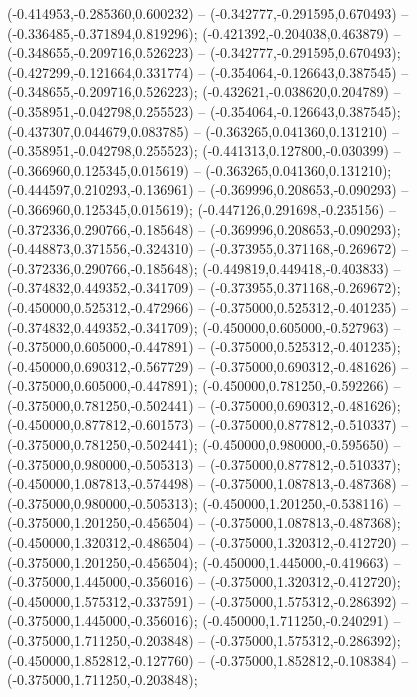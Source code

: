 (-0.414953,-0.285360,0.600232) -- (-0.342777,-0.291595,0.670493) -- (-0.336485,-0.371894,0.819296);
 (-0.421392,-0.204038,0.463879) -- (-0.348655,-0.209716,0.526223) -- (-0.342777,-0.291595,0.670493);
 (-0.427299,-0.121664,0.331774) -- (-0.354064,-0.126643,0.387545) -- (-0.348655,-0.209716,0.526223);
 (-0.432621,-0.038620,0.204789) -- (-0.358951,-0.042798,0.255523) -- (-0.354064,-0.126643,0.387545);
 (-0.437307,0.044679,0.083785) -- (-0.363265,0.041360,0.131210) -- (-0.358951,-0.042798,0.255523);
 (-0.441313,0.127800,-0.030399) -- (-0.366960,0.125345,0.015619) -- (-0.363265,0.041360,0.131210);
 (-0.444597,0.210293,-0.136961) -- (-0.369996,0.208653,-0.090293) -- (-0.366960,0.125345,0.015619);
 (-0.447126,0.291698,-0.235156) -- (-0.372336,0.290766,-0.185648) -- (-0.369996,0.208653,-0.090293);
 (-0.448873,0.371556,-0.324310) -- (-0.373955,0.371168,-0.269672) -- (-0.372336,0.290766,-0.185648);
 (-0.449819,0.449418,-0.403833) -- (-0.374832,0.449352,-0.341709) -- (-0.373955,0.371168,-0.269672);
 (-0.450000,0.525312,-0.472966) -- (-0.375000,0.525312,-0.401235) -- (-0.374832,0.449352,-0.341709);
 (-0.450000,0.605000,-0.527963) -- (-0.375000,0.605000,-0.447891) -- (-0.375000,0.525312,-0.401235);
 (-0.450000,0.690312,-0.567729) -- (-0.375000,0.690312,-0.481626) -- (-0.375000,0.605000,-0.447891);
 (-0.450000,0.781250,-0.592266) -- (-0.375000,0.781250,-0.502441) -- (-0.375000,0.690312,-0.481626);
 (-0.450000,0.877812,-0.601573) -- (-0.375000,0.877812,-0.510337) -- (-0.375000,0.781250,-0.502441);
 (-0.450000,0.980000,-0.595650) -- (-0.375000,0.980000,-0.505313) -- (-0.375000,0.877812,-0.510337);
 (-0.450000,1.087813,-0.574498) -- (-0.375000,1.087813,-0.487368) -- (-0.375000,0.980000,-0.505313);
 (-0.450000,1.201250,-0.538116) -- (-0.375000,1.201250,-0.456504) -- (-0.375000,1.087813,-0.487368);
 (-0.450000,1.320312,-0.486504) -- (-0.375000,1.320312,-0.412720) -- (-0.375000,1.201250,-0.456504);
 (-0.450000,1.445000,-0.419663) -- (-0.375000,1.445000,-0.356016) -- (-0.375000,1.320312,-0.412720);
 (-0.450000,1.575312,-0.337591) -- (-0.375000,1.575312,-0.286392) -- (-0.375000,1.445000,-0.356016);
 (-0.450000,1.711250,-0.240291) -- (-0.375000,1.711250,-0.203848) -- (-0.375000,1.575312,-0.286392);
 (-0.450000,1.852812,-0.127760) -- (-0.375000,1.852812,-0.108384) -- (-0.375000,1.711250,-0.203848);
